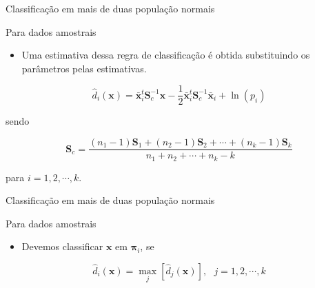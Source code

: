 \documentclass[
  ignorenonframetext,
  aspectratio=169,
]{beamer}
\providecommand{\tightlist}{%
  \setlength{\itemsep}{0pt}\setlength{\parskip}{0pt}}
\begin{document}
\begin{frame}{Classificação em mais de duas população normais}
\label{classificauxe7uxe3o-em-mais-de-duas-populauxe7uxe3o-normais-7}
\begin{block}{Para dados amostrais}
\label{para-dados-amostrais-4}
\begin{itemize}
\tightlist
\item
  Uma estimativa dessa regra de classificação é obtida substituindo os
  parâmetros pelas estimativas.
\end{itemize}

\[
\hat{d}_i(\boldsymbol{x}) = \bar{\boldsymbol{x}}_i^t \boldsymbol{S}_c^{-1} \boldsymbol{x} - \dfrac{1}{2} \bar{\boldsymbol{x}}_i^t\boldsymbol{S}_c^{-1}\bar{\boldsymbol{x}}_i + \ln\left( p_i\right) 
\]

sendo

\[\boldsymbol{S}_c = \displaystyle{\frac{(n_1 - 1)\boldsymbol{S}_1 + (n_2 - 1)\boldsymbol{S}_2 + \cdots + (n_k - 1)\boldsymbol{S}_k}{n_1 + n_2 + \cdots + n_k - k}}\]

para \(i = 1, 2, \cdots, k\).
\end{block}
\end{frame}

\begin{frame}{Classificação em mais de duas população normais}
\label{classificauxe7uxe3o-em-mais-de-duas-populauxe7uxe3o-normais-8}
\begin{block}{Para dados amostrais}
\label{para-dados-amostrais-5}
\begin{itemize}
\tightlist
\item
  Devemos classificar \(\boldsymbol{x}\) em \(\boldsymbol{\pi}_i\), se
\end{itemize}

\[\hat{d}_i(\boldsymbol{x}) = \max_j \left[\hat{d}_j(\boldsymbol{x})\right], \,\,\,\, j = 1, 2, 
\cdots, k\]
\end{block}
\end{frame}
\end{document}
